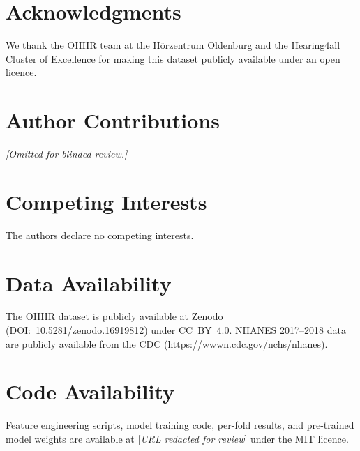 \documentclass[12pt,a4paper]{article}
\begin{document}
\section*{Acknowledgments}

We thank the OHHR team at the Hörzentrum Oldenburg and the Hearing4all Cluster
of Excellence for making this dataset publicly available under an open licence.

\section*{Author Contributions}

\textit{[Omitted for blinded review.]}

\section*{Competing Interests}

The authors declare no competing interests.

\section*{Data Availability}

The OHHR dataset is publicly available at Zenodo
(DOI:~10.5281/zenodo.16919812) under CC~BY~4.0.  NHANES 2017--2018 data are
publicly available from the CDC (\url{https://wwwn.cdc.gov/nchs/nhanes}).

\section*{Code Availability}

Feature engineering scripts, model training code, per-fold results, and
pre-trained model weights are available at [\textit{URL redacted for review}]
under the MIT licence.
\end{document}
